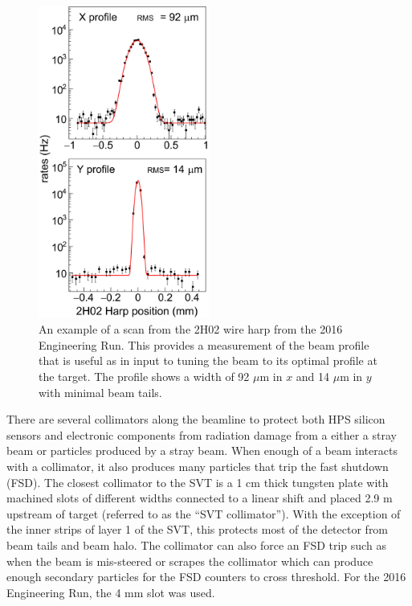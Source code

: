 \begin{figure}
    \centering
    \includegraphics[width=0.5\textwidth]{figs/detector/2H02harp.jpg}
    \caption{An example of a scan from the 2H02 wire harp from the 2016 Engineering Run. This provides a measurement of the beam profile that is useful as in input to tuning the beam to its optimal profile at the target. The profile shows a width of 92 $\mu$m in $x$ and 14 $\mu$m in $y$ with minimal beam tails.}
    \label{fig:harpscan}
\end{figure}

There are several collimators along the beamline to protect both HPS silicon sensors and electronic components from radiation damage from a either a stray beam or particles produced by a stray beam. When enough of a beam interacts with a collimator, it also produces many particles that trip the fast shutdown (FSD). The closest collimator to the SVT is a 1 cm thick tungsten plate with machined slots of different widths connected to a linear shift and placed 2.9 m upstream of target (referred to as the ``SVT collimator''). With the exception of the inner strips of layer 1 of the SVT, this protects most of the detector from beam tails and beam halo. The collimator can also force an FSD trip such as when the beam is mis-steered or scrapes the collimator which can produce enough secondary particles for the FSD counters to cross threshold. For the 2016 Engineering Run, the 4 mm slot was used. 

